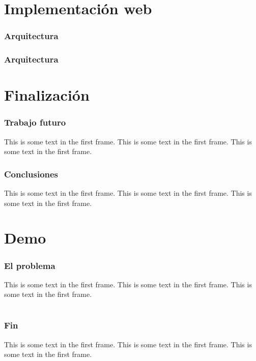 \documentclass[aspectratio=169]{beamer}
\begin{document}
\section{Implementación web}
\begin{frame}
\frametitle{Arquitectura}
\end{frame}

\begin{frame}
    \frametitle{Arquitectura}
\end{frame}








\section{Finalización}
\begin{frame}
    \frametitle{Trabajo futuro}
    This is some text in the first frame. This is some text in the first frame. This is some text in the first frame.
\end{frame}

\begin{frame}
    \frametitle{Conclusiones}
    This is some text in the first frame. This is some text in the first frame. This is some text in the first frame.
\end{frame}









\section{Demo}
\begin{frame}
    \frametitle{El problema}
    This is some text in the first frame. This is some text in the first frame. This is some text in the first frame.
\end{frame}






\section{}
\begin{frame}
    \frametitle{Fin}
    This is some text in the first frame. This is some text in the first frame. This is some text in the first frame.
\end{frame}
\end{document}
